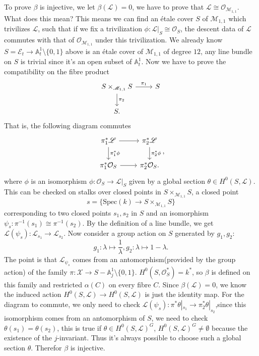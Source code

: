 \documentclass[main.tex]{subfiles}
\begin{document}
\begin{example}
To prove $\beta$ is injective, we let $\beta(\mathscr{L})=0$, we have to prove that $\mathscr{L}\cong \mathcal{O}_{\mathscr{M}_{1,1}}$. What does this mean? This means we can find an étale cover $S$ of $\mathscr{M}_{1,1}$ which trivilizes $\mathscr{L}$, such that if we fix a trivilization $\phi:\mathscr{L}|_{S}\cong \mathcal{O}_{S}$, the descent data of $\mathscr{L}$ commutes with that of $\mathscr{O}_{\mathscr{M}_{1,1}}$ under this trivilization. We already know $S=\mathscr{E}_{t}\rightarrow \mathbb{A}_{t}^{1}\setminus\{0,1\}$ above is an étale cover of $\mathscr{M}_{1,1}$ of degree $12$, any line bundle on $S$ is trivial since it's an open subset of $\mathbb{A}_{t}^{1}$. Now we have to prove the compatibility on the fibre product 
$$\begin{tikzcd}S\times_{\mathscr{M}_{1,1}}S\arrow{r}{\pi_{1}}\arrow{d}{\pi_{2}} & S\\
S.\end{tikzcd}$$ 
That is, the following diagram commutes 
$$\begin{tikzcd}\pi_{1}^{*}\mathscr{L}\arrow{r}\arrow{d}{\pi_{1}^{*}\phi} & \pi_{2}^{*}\mathscr{L}\arrow{d}{\pi_{2}^{*}\phi}\\
\pi_{1}^{*}\mathcal{O}_{S}\arrow{r} & \pi_{2}^{*}\mathcal{O}_{S}.\end{tikzcd},$$
where $\phi$ is an isomorphism $\phi: \mathcal{O}_{S}\rightarrow \mathscr{L}|_{S}$ given by a global section $\theta\in H^{0}(S, \mathscr{L})$. This can be checked on stalks over closed points in $S\times_{\mathscr{M}_{1,1}}S$, a closed point $$s=\{\mathrm{Spec}(k)\rightarrow S\times_{\mathscr{M}_{1,1}}S\}$$ corresponding to two closed points $s_{1}, s_{2}$ in $S$ and an isomorphism $\psi_{s}:\pi^{-1}(s_{1})\cong\pi^{-1}(s_{2}).$ By the definition of a line bundle, we get $\mathscr{L}(\psi_{s}): \mathscr{L}_{s_{1}}\rightarrow \mathscr{L}_{s_{2}}$. Now consider a group action on $S$ generated by $g_{1}, g_{2}$:
$$g_{1}: \lambda \mapsto \frac{1}{\lambda}, g_{2}:\lambda \mapsto 1-\lambda.$$
The point is that $\mathscr{L}_{\psi_{s}}$ comes from an antomorphism(provided by the group action) of the family $\pi: \mathscr{X}\rightarrow S-\mathbb{A}_{j}^{1}\setminus\{0,1\}$. $H^{0}(S, \mathcal{O}_{S}^{*})=k^{*}$, so $\beta$ is defined on this family and restricted $\alpha(C)$ on every fibre $C$. Since $\beta(\mathscr{L})=0$, we know the induced action $H^{0}(S,\mathscr{L})\rightarrow H^{0}(S,\mathscr{L})$ is just the identity map. For the diagram to commute, we only need to check $\mathscr{L}(\psi_{s}):\pi^{*}\theta|_{s_{1}}\rightarrow \pi_{2}^{*}\theta|_{s_{2}}$,since this isomorphism comes from an antomorphism of $S$, we need to check $\theta(s_{1})=\theta(s_{2})$, this is true if $\theta\in H^{0}(S, \mathscr{L})^{G}$, $H^{0}(S, \mathscr{L})^{G}\neq \emptyset$ because the existence of the $j$-invariant. Thus it's always possible to choose such a global section $\theta$. Therefor $\beta$ is injective. 

\end{example}
\end{document}
